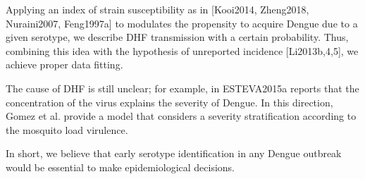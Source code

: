         Applying an index of strain susceptibility as in  [Kooi2014,
    Zheng2018, Nuraini2007, Feng1997a] to modulates the propensity to
    acquire Dengue due to a given serotype,  we describe DHF transmission
    with a certain probability.  Thus, combining this idea with the
    hypothesis of unreported incidence [Li2013b,4,5], we achieve proper
    data fitting. 

        The cause of DHF is still unclear; for example, in ESTEVA2015a reports
    that the concentration of the virus explains the severity of Dengue.
    In this direction, Gomez et al. provide a model that considers a
    severity stratification according to the mosquito load virulence.

        In short, we believe that early serotype identification in any Dengue
    outbreak would be essential to  make epidemiological decisions.
